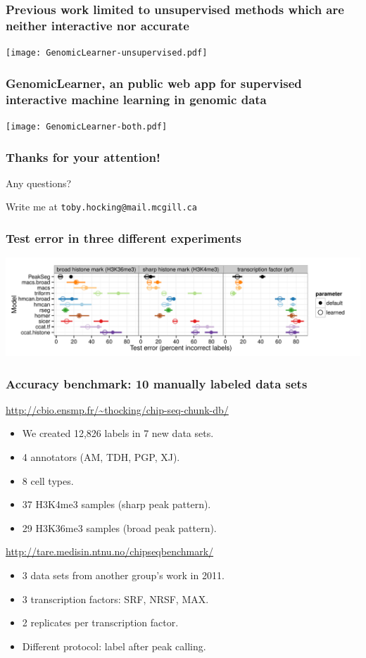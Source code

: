 \documentclass{beamer}
\begin{document}
\begin{frame}
  \frametitle{Previous work limited to 
    unsupervised methods
which are neither interactive nor accurate
}
  \texttt{[image: GenomicLearner-unsupervised.pdf]}
\end{frame}

\begin{frame}
  \frametitle{GenomicLearner, an public web app for supervised interactive machine learning in genomic data}
  \texttt{[image: GenomicLearner-both.pdf]}
\end{frame}


\begin{frame}
  \frametitle{Thanks for your attention!}

Any questions?

\hskip 1cm


 Write me at \alert{\texttt{toby.hocking@mail.mcgill.ca}} 



\end{frame}

\appendix

\begin{frame}
  \frametitle{Test error in three different experiments}
  \includegraphics[width=1.1\textwidth]{figure-test-error-dots-mean.pdf}
\end{frame}

\begin{frame}
  \frametitle{Accuracy benchmark: 10 manually labeled data sets}
  \url{http://cbio.ensmp.fr/~thocking/chip-seq-chunk-db/}
  \begin{itemize}
  \item We created 12,826 labels in 7 new data sets.
  \item 4 annotators (AM, TDH, PGP, XJ).
  \item 8 cell types.
  \item 37 H3K4me3 samples (sharp peak pattern).
  \item 29 H3K36me3 samples (broad peak pattern).
  \end{itemize}
  \vskip 1cm
  \url{http://tare.medisin.ntnu.no/chipseqbenchmark/}
  \begin{itemize}
  \item 3 data sets from another group's work in 2011.
  \item 3 transcription factors: SRF, NRSF, MAX.
  \item 2 replicates per transcription factor.
  \item Different protocol: label after peak calling.
  \end{itemize}
\end{frame}
\end{document}
